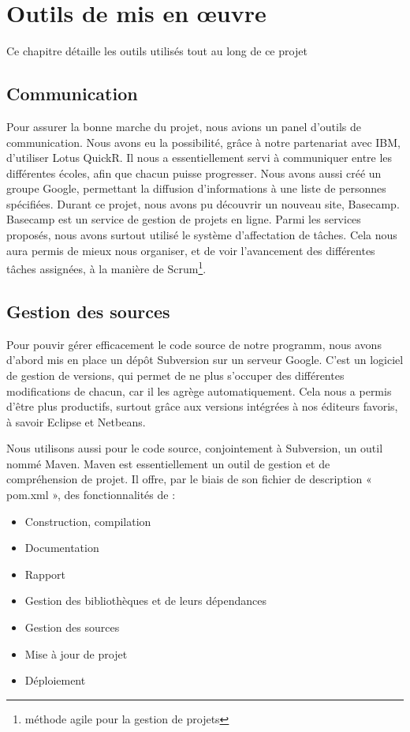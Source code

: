 \chapter{Outils de mis en \oe{}uvre}
\minitoc

Ce chapitre détaille les outils utilisés tout au long de ce projet

\section{Communication}

Pour assurer la bonne marche du projet, nous avions un panel d’outils de communication.
Nous avons eu la possibilité, grâce à notre partenariat avec IBM, d’utiliser Lotus QuickR.
Il nous a essentiellement servi à communiquer entre les différentes écoles, afin que chacun puisse progresser.
Nous avons aussi créé un groupe Google, permettant la diffusion d’informations à une liste de personnes spécifiées.
Durant ce projet, nous avons pu découvrir un nouveau site, Basecamp.
Basecamp est un service de gestion de projets en ligne.
Parmi les services proposés, nous avons surtout utilisé le système d’affectation de tâches.
Cela nous aura permis de mieux nous organiser, et de voir l’avancement des différentes tâches assignées, à la manière de Scrum\footnote{méthode agile pour la gestion de projets}.

\section{Gestion des sources}

Pour pouvir gérer efficacement le code source de notre programm, nous avons d’abord mis en place un dépôt Subversion sur un serveur Google.
C’est un logiciel de gestion de versions, qui permet de ne plus s’occuper des différentes modifications de chacun, car il les agrège automatiquement.
Cela nous a permis d’être plus productifs, surtout grâce aux versions intégrées à nos éditeurs favoris, à savoir Eclipse et Netbeans.


Nous utilisons aussi pour le code source, conjointement à Subversion, un outil nommé Maven.
Maven est essentiellement un outil de gestion et de compréhension de projet.
Il offre, par le biais de son fichier de description « pom.xml »,  des fonctionnalités de :
\begin{itemize}
\item Construction, compilation
\item Documentation
\item Rapport
\item Gestion des bibliothèques et de leurs dépendances
\item Gestion des sources
\item Mise à jour de projet
\item Déploiement
\end{itemize}


